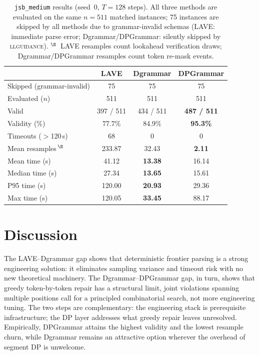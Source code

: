 \begin{table}[t]
\centering
\small
\setlength{\tabcolsep}{8pt}
\begin{tabular}{lccc}
  \toprule
   & LAVE & Dgrammar & DPGrammar \\
  \midrule
  Skipped (grammar-invalid)                    & 75 & 75 & 75 \\
  Evaluated ($n$)                              & 511 & 511 & 511 \\
  \midrule
  Valid                                        & 397 / 511 & 434 / 511 & \textbf{487 / 511} \\
  Validity (\%)                                & 77.7\% & 84.9\% & \textbf{95.3\%} \\
  Timeouts ($>$120\,s)                         & 68 & 0 & 0 \\
  Mean resamples\,$^\S$                        & 233.87 & 32.43 & \textbf{2.11} \\
  \midrule
  Mean time (s)                                & 41.12 & \textbf{13.38} & 16.14 \\
  Median time (s)                              & 27.34 & \textbf{13.65} & 15.61 \\
  P95 time (s)                                 & 120.00 & \textbf{20.93} & 29.36 \\
  Max time (s)                                 & 120.05 & \textbf{33.45} & 88.17 \\
  \bottomrule
\end{tabular}
\caption{\label{tab:main}%
  \texttt{jsb\_medium} results (seed~0, $T{=}128$ steps).
  All three methods are evaluated on the same $n{=}511$ matched instances;
  75 instances are skipped by all methods due to grammar-invalid schemas
  (LAVE: immediate parse error; Dgrammar/DPGrammar: silently skipped by \textsc{llguidance}).
  $^\S$~LAVE resamples count lookahead verification draws; Dgrammar/DPGrammar resamples count token re-mask events.}
\end{table}

\section{Discussion}

The LAVE–Dgrammar gap shows that deterministic frontier parsing is a strong engineering solution: it eliminates sampling variance and timeout risk with no new theoretical machinery. The Dgrammar–DPGrammar gap, in turn, shows that greedy token-by-token repair has a structural limit, joint violations spanning multiple positions call for a principled combinatorial search, not more engineering tuning. The two steps are complementary: the engineering stack is prerequisite infrastructure; the DP layer addresses what greedy repair leaves unresolved. Empirically, DPGrammar attains the highest validity and the lowest resample churn, while Dgrammar remains an attractive option wherever the overhead of segment DP is unwelcome.

